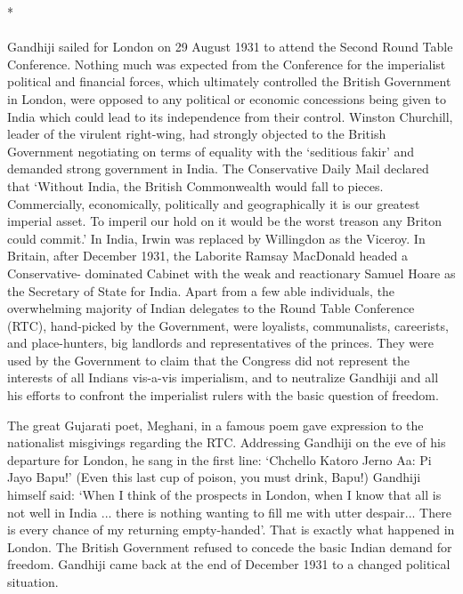 \begin{center}*\end{center}

\paragraph*{}


Gandhiji sailed for London on 29 August 1931 to attend the Second Round Table Conference. Nothing much was expected from the Conference for the imperialist political and financial forces, which ultimately controlled the British Government in London, were opposed to any political or economic concessions being given to India which could lead to its independence from their control. Winston Churchill, leader of the virulent right-wing, had strongly objected to the British Government negotiating on terms of equality with the `seditious fakir' and demanded strong government in India. The Conservative Daily Mail declared that `Without India, the British Commonwealth would fall to pieces. Commercially, economically, politically and geographically it is our greatest imperial asset. To imperil our hold on it would be the worst treason any Briton could commit.' In India, Irwin was replaced by Willingdon as the Viceroy. In Britain, after December 1931, the Laborite Ramsay MacDonald headed a Conservative- dominated Cabinet with the weak and reactionary Samuel Hoare as the Secretary of State for India. Apart from a few able individuals, the overwhelming majority of Indian delegates to the Round Table Conference (RTC), hand-picked by the Government, were loyalists, communalists, careerists, and place-hunters, big landlords and representatives of the princes. They were used by the Government to claim that the Congress did not represent the interests of all Indians vis-a-vis imperialism, and to neutralize Gandhiji and all his efforts to confront the imperialist rulers with the basic question of freedom. 

The great Gujarati poet, Meghani, in a famous poem gave expression to the nationalist misgivings regarding the RTC. Addressing Gandhiji on the eve of his departure for London, he sang in the first line: `Chchello Katoro Jerno Aa: Pi Jayo Bapu!' (Even this last cup of poison, you must drink, Bapu!) Gandhiji himself said: `When I think of the prospects in London, when I know that all is not well in India ... there is nothing wanting to fill me with utter despair... There is every chance of my returning empty-handed'. That is exactly what happened in London. The British Government refused to concede the basic Indian demand for freedom. Gandhiji came back at the end of December 1931 to a changed political situation. 


